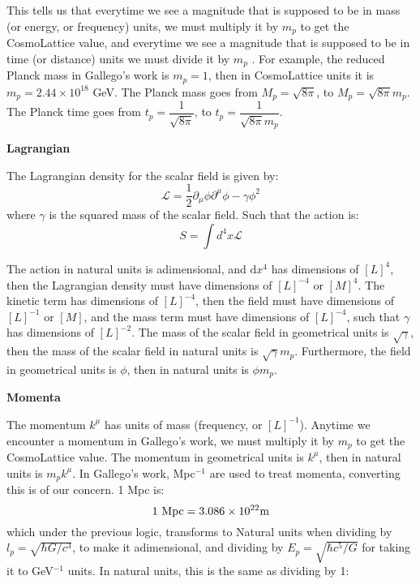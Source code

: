 \documentclass{article}
\begin{document}
\vspace{0.25cm}

This tells us that everytime we see a magnitude that is supposed to be in mass (or energy, or frequency) units, we must multiply it by $m_p$ to get the CosmoLattice value, and everytime we see a magnitude that is supposed to be in time (or distance) units we must divide it by $m_p$ . For example, the reduced Planck mass in Gallego's work is $m_p=1$, then in CosmoLattice units it is $m_p=2.44\times10^{18}$ GeV. The Planck mass goes from $M_p=\sqrt{8\pi}$, to $M_p=\sqrt{8\pi}m_p$. The Planck time goes from $t_p=\dfrac{1}{\sqrt{8\pi}}$, to $t_p=\dfrac{1}{\sqrt{8\pi}m_p}$.

\textbf{Lagrangian}

The Lagrangian density for the scalar field is given by:
\begin{equation}
    \mathcal{L}=\dfrac{1}{2}\partial_\mu\phi\partial^\mu\phi-\gamma\phi^2
\end{equation}
where $\gamma$ is the squared mass of the scalar field. Such that the action is:
\begin{equation}
    S=\int d^4x\mathcal{L}
\end{equation}

The action in natural units is adimensional, and $\text{d}x^4$ has dimensions of $[L]^4$, then the Lagrangian density must have dimensions of $[L]^{-4}$ or $[M]^4$. The kinetic term has dimensions of $[L]^{-4}$, then the field must have dimensions of $[L]^{-1}$ or $[M]$, and the mass term must have dimensions of $[L]^{-4}$, such that $\gamma$ has dimensions of $[L]^{-2}$. The mass of the scalar field in geometrical units is $\sqrt{\gamma}$, then the mass of the scalar field in natural units is $\sqrt{\gamma}m_p$. Furthermore, the field in geometrical units is $\phi$, then in natural units is $\phi m_p$. 
\vspace{0.25cm}

\textbf{Momenta}

The momentum $k^\mu$ has units of mass (frequency, or $[L]^{-1}$). Anytime we encounter a momentum in Gallego's work, we must multiply it by $m_p$ to get the CosmoLattice value.  The momentum in geometrical units is $k^\mu$, then in natural units is $m_p k^\mu$. In Gallego's work, Mpc$^{-1}$ are used to treat momenta, converting this is of our concern. 1 Mpc is:
$$1 \text{ Mpc}=3.086\times10^{22} \text m$$
which under the previous logic, transforms to Natural units when dividing by $l_{p}=\sqrt{\hbar G/c^3}$, to make it adimensional, and dividing by $E_p=\sqrt{\hbar c^5/G}$ for taking it to GeV$^{-1}$ units. In natural units, this is the same as dividing by 1:
\end{document}
